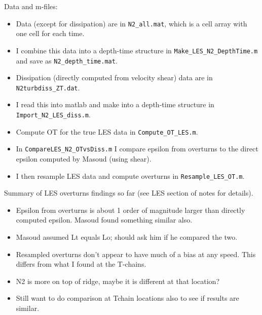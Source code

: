 \documentclass[11pt]{article}
\begin{document}
Data and m-files:
\begin{itemize}
\item Data (except for dissipation) are in \verb+N2_all.mat+, which is a cell array with one cell for each time.
\item  I combine this data into a depth-time structure in \verb+Make_LES_N2_DepthTime.m+ and save as \verb+N2_depth_time.mat+.
\item  Dissipation (directly computed from velocity shear) data are in \verb+N2turbdiss_ZT.dat+. 
\item I read this into matlab and make into a depth-time structure in \verb+Import_N2_LES_diss.m+.
\item Compute OT for the true LES data in \verb+Compute_OT_LES.m+.	
\item In \verb+CompareLES_N2_OTvsDiss.m+ I compare epsilon from overturns to the direct epsilon computed by Masoud (using shear). 
\item I then resample LES data and compute overturns in \verb+Resample_LES_OT.m+.
\end{itemize}


Summary of LES overturns findings so far (see LES section of notes for details).
\begin{itemize}
\item Epsilon from overturns is about 1 order of magnitude larger than directly computed epsilon. Masoud found something similar also.
\item Masoud assumed Lt equals Lo; should ask him if he compared the two.
\item Resampled overturns don't appear to have much of a bias at any speed. This differs from what I found at the T-chains.
\item N2 is more on top of ridge, maybe it is different at that location?
\item Still want to do comparison at Tchain locations also to see if results are similar.
\end{itemize}
\end{document}
